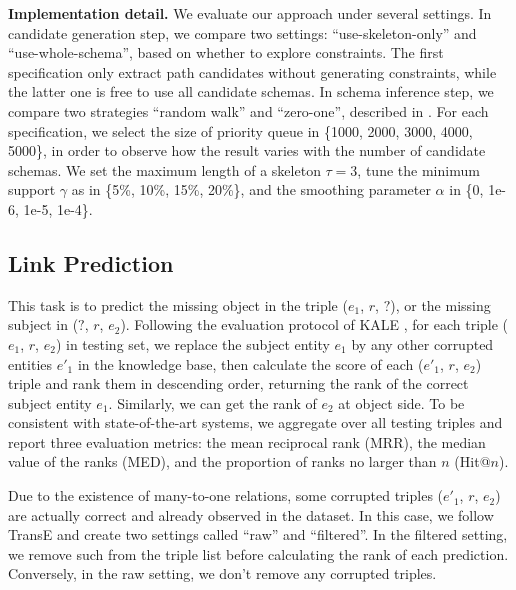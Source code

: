 \noindent
\textbf{Implementation detail.}
We evaluate our approach under several settings.
In candidate generation step, we compare two settings: 
``use-skeleton-only'' and ``use-whole-schema'', based on 
whether to explore constraints.
The first specification only extract path candidates without generating 
constraints, while the latter one is free to use all candidate schemas.
In schema inference step, we compare two strategies ``random walk'' 
and ``zero-one'', described in . 
For each specification, we select the size of priority queue in 
\{1000, 2000, 3000, 4000, 5000\},
in order to observe how the result varies with the number of candidate schemas.
We set the maximum length of a skeleton $\tau = 3$,
tune the minimum support $\gamma$ as in \{5\%, 10\%, 15\%, 20\%\},
and the smoothing parameter $\alpha$ in \{0, 1e-6, 1e-5, 1e-4\}.

\subsection{Link Prediction}
This task is to predict the missing object in the triple ($e_1$, $r$, $?$),
or the missing subject in ($?$, $r$, $e_2$).
Following the evaluation protocol of KALE \cite{guo2016jointly},
for each triple ($e_1$, $r$, $e_2$) in testing set, 
we replace the subject entity $e_1$
by any other corrupted entities $e'_1$ in the knowledge base, 
then calculate the score of each ($e'_1$, $r$, $e_2$) triple and rank them in descending order,
returning the rank of the correct subject entity $e_1$.
Similarly, we can get the rank of $e_2$ at object side.
To be consistent with state-of-the-art systems, we aggregate over all testing triples
and report three evaluation metrics: 
the mean reciprocal rank (MRR), the median value
of the ranks (MED), and the proportion of ranks no larger than $n$ (Hit@$n$).

Due to the existence of many-to-one relations, some corrupted triples ($e'_1$, $r$, $e_2$)
are actually correct and already observed in the dataset.
In this case, we follow TransE \cite{bordes2013translating}
and create two settings called ``raw'' and ``filtered''.
In the filtered setting, we remove such  from the triple list
before calculating the rank of each prediction.
Conversely, in the raw setting, we don't remove any corrupted triples.

